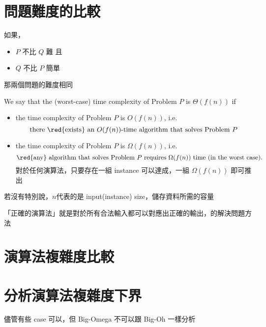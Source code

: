 
\section{問題難度的比較}


如果，
\begin{itemize}
    \item $P$ 不比 $Q$ 難 且
    \item $Q$ 不比 $P$ 簡單
\end{itemize}
那兩個問題的難度相同

\begin{definition}
    We say that the (worst-case) time complexity of Problem $P$ is $\Theta(f(n))$ if
    \begin{itemize}
        \item the time complexity of Problem $P$ is $O(f(n))$, i.e.
            \[
                \text{there \red{exists} an }O(f(n))\text{-time algorithm that solves Problem }P
            \]
        \item the time complexity of Problem $P$ is $\Omega(f (n))$, i.e. 
            \[
                \text{\red{any} algorithm that solves Problem }P\text{ requires }\Omega(f (n))\text{ time (in the worst case).}
            \]
        對於任何演算法，只要存在一組 instance 可以達成，一組 $\Omega(f(n))$ 即可推出
    \end{itemize}
\end{definition}

\begin{note}
若沒有特別說，$n$代表的是 input(instance) size，儲存資料所需的容量
\end{note}

\begin{note}
「正確的演算法」就是對於所有合法輸入都可以對應出正確的輸出，的解決問題方法
\end{note}

\section{演算法複雜度比較}

\section{分析演算法複雜度下界}

\begin{note}
    儘管有些 case 可以，但 Big-Omega 不可以跟 Big-Oh 一樣分析
\end{note}

